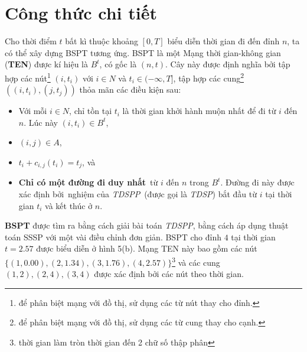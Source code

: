 \documentclass[../main.tex]{subfiles}
\begin{document}
\section{Công thức chi tiết}\label{cong-thuc1}

Cho thời điểm \(t\) bất kì thuộc khoảng \([0, T]\) biểu diễn thời gian
đi đến đỉnh \(n\), ta có thể xây dựng BSPT tương ứng. BSPT là một Mạng
thời gian-không gian (\textbf{TEN}) được kí hiệu là \(B^t\), có gốc là
\((n, t)\). Cây này được định nghĩa bởi tập hợp các nút\footnote{để phân
  biệt mạng với đồ thị, sử dụng các từ nút thay cho đỉnh.} \((i, t_i)\)
với \(i \in N\) và \(t_i \in (-\infty, T]\), tập hợp các cung\footnote{để
  phân biệt mạng với đồ thị, sử dụng các từ cung thay cho cạnh.}
\(((i, t_i), (j, t_j))\) thỏa mãn các điều kiện sau: 

\begin{itemize}
\tightlist
\item
  Với mỗi \(i\in N\), chỉ tồn tại \(t_i\) là thời gian khởi hành muộn
  nhất để đi từ \(i\) đến \(n\). Lúc này \((i, t_i)\in B^t\),
\item
  \((i, j) \in A\),
\item
  \(t_i + c_{i, j}(t_i) = t_j\), và
\item
  \textbf{Chỉ có một đường đi duy nhất}~từ \(i\) đến \(n\) trong
  \(B^t\). Đường đi này được xác định bởi~nghiệm của \emph{TDSPP}~(được
  gọi là \emph{TDSP}) bắt đầu từ \(i\) tại thời gian \(t_i\) và kết thúc
  ở \(n\).
\end{itemize}

\textbf{BSPT} được tìm ra
bằng cách giải bài toán \emph{TDSPP}, bằng cách áp dụng thuật toán SSSP
với một vài điều chỉnh đơn giản. BSPT cho đỉnh \(4\) tại thời gian
\(t=2.57\) được biểu diễn ở hình 5(b). Mạng TEN này bao gồm các nút
\(\{(1, 0.00), (2, 1.34), (3, 1.76), (4, 2.57)\}\)\footnote{thời gian
  làm tròn thời gian đến 2 chữ số thập phân} và các cung
\((1, 2), (2, 4), (3, 4)\) được xác định bởi các nút theo thời gian.
\end{document}
